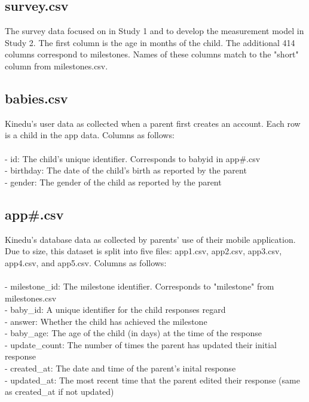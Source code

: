 \documentclass{article}
\begin{document}
\subsection*{survey.csv}

The survey data focused on in Study 1 and to develop the measurement model in Study 2. The first column is the age in months of the child. The additional 414 columns correspond to milestones. Names of these columns match to the "short" column from milestones.csv.

\subsection*{babies.csv}

Kinedu's user data as collected when a parent first creates an account. Each row is a child in the app data. Columns as follows: \\\\
- id: The child's unique identifier. Corresponds to babyid in app#.csv \\
- birthday: The date of the child's birth as reported by the parent \\
- gender: The gender of the child as reported by the parent

\subsection*{app#.csv}

Kinedu's database data as collected by parents' use of their mobile application. Due to size, this dataset is split into five files: app1.csv, app2.csv, app3.csv, app4.csv, and app5.csv. Columns as follows: \\\\
- milestone\_id: The milestone identifier. Corresponds to "milestone" from milestones.csv \\
- baby\_id: A unique identifier for the child responses regard \\
- answer: Whether the child has achieved the milestone \\
- baby\_age: The age of the child (in days) at the time of the response \\
- update\_count: The number of times the parent has updated their initial response \\
- created\_at: The date and time of the parent's inital response \\
- updated\_at: The most recent time that the parent edited their response (same as created\_at if not updated)
\end{document}
